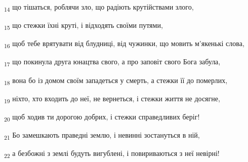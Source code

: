 \begin{tcolorbox}
\textsubscript{14} що тішаться, роблячи зло, що радіють крутійствами злого,
\end{tcolorbox}
\begin{tcolorbox}
\textsubscript{15} що стежки їхні круті, і відходять своїми путями,
\end{tcolorbox}
\begin{tcolorbox}
\textsubscript{16} щоб тебе врятувати від блудниці, від чужинки, що мовить м'якенькі слова,
\end{tcolorbox}
\begin{tcolorbox}
\textsubscript{17} що покинула друга юнацтва свого, а про заповіт свого Бога забула,
\end{tcolorbox}
\begin{tcolorbox}
\textsubscript{18} вона бо із домом своїм западеться у смерть, а стежки її до померлих,
\end{tcolorbox}
\begin{tcolorbox}
\textsubscript{19} ніхто, хто входить до неї, не вернеться, і стежки життя не досягне,
\end{tcolorbox}
\begin{tcolorbox}
\textsubscript{20} щоб ходив ти дорогою добрих, і стежки справедливих беріг!
\end{tcolorbox}
\begin{tcolorbox}
\textsubscript{21} Бо замешкають праведні землю, і невинні зостануться в ній,
\end{tcolorbox}
\begin{tcolorbox}
\textsubscript{22} а безбожні з землі будуть вигублені, і повириваються з неї невірні!
\end{tcolorbox}
